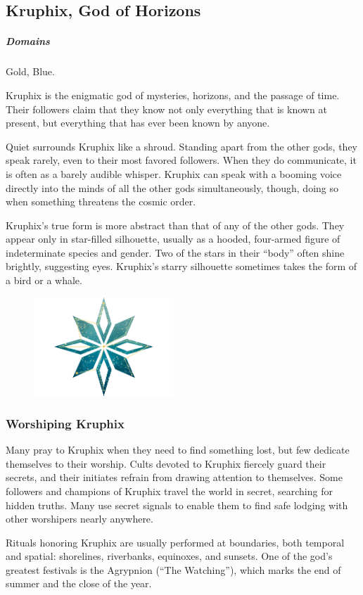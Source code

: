         \pagebreak
\subsection*{Kruphix, God of Horizons} \label{ssec::kruphix}
    \subparagraph{Domains} Gold, Blue.

    Kruphix is the enigmatic god of mysteries, horizons, and the passage of time.
    Their followers claim that they know not only everything that is known at present, but everything that has ever been known by anyone.

    Quiet surrounds Kruphix like a shroud.
    Standing apart from the other gods, they speak rarely, even to their most favored followers.
    When they do communicate, it is often as a barely audible whisper.
    Kruphix can speak with a booming voice directly into the minds of all the other gods simultaneously, though, doing so when something threatens the cosmic order.

    Kruphix's true form is more abstract than that of any of the other gods.
    They appear only in star-filled silhouette, usually as a hooded, four-armed figure of indeterminate species and gender.
    Two of the stars in their ``body'' often shine brightly, suggesting eyes.
    Kruphix's starry silhouette sometimes takes the form of a bird or a whale.

    \begin{figure}[b]
        \centering
        \includegraphics[width=0.47\textwidth]{02viphoger/img/10s_kruphix.png}
    \end{figure}

    \subsubsection{Worshiping Kruphix}
        Many pray to Kruphix when they need to find something lost, but few dedicate themselves to their worship.
        Cults devoted to Kruphix fiercely guard their secrets, and their initiates refrain from drawing attention to themselves.
        Some followers and champions of Kruphix travel the world in secret, searching for hidden truths.
        Many use secret signals to enable them to find safe lodging with other worshipers nearly anywhere.

        Rituals honoring Kruphix are usually performed at boundaries, both temporal and spatial: shorelines, riverbanks, equinoxes, and sunsets.
        One of the god's greatest festivals is the Agrypnion (``The Watching''), which marks the end of summer and the close of the year.

\pagebreak
